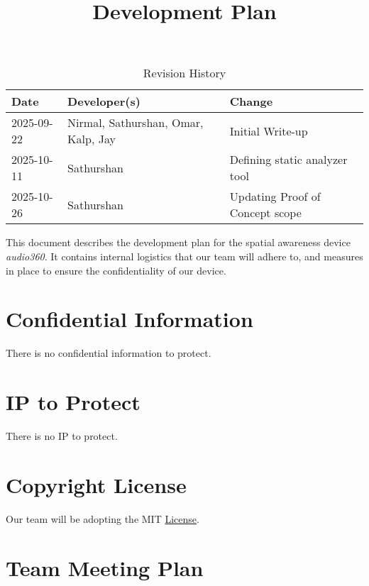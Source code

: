 \documentclass{article}
\title{Development Plan\\\progname}
\author{\authname}
\date{}
\begin{document}
\maketitle

\newpage{}

\begin{table}[hp]
\caption{Revision History} \label{TblRevisionHistory}
\begin{tabularx}{\textwidth}{llX}
\toprule
\textbf{Date} & \textbf{Developer(s)} & \textbf{Change}\\
\midrule
2025-09-22 & Nirmal, Sathurshan, Omar, Kalp, Jay & Initial Write-up\\
2025-10-11 & Sathurshan & Defining static analyzer tool\\
2025-10-26 & Sathurshan & Updating Proof of Concept scope\\
\bottomrule
\end{tabularx}
\end{table}

\newpage

\tableofcontents

\newpage{}

This document describes the development plan for the spatial awareness device
\textit{audio360}. It contains internal logistics that our team will adhere to,
and measures in place to ensure the confidentiality of our device.

\section{Confidential Information}

There is no confidential information to protect.

\section{IP to Protect}

There is no IP to protect.

\section{Copyright License}

Our team will be adopting the MIT
\href{https://github.com/Nirmal-code/SixSense/blob/main/LICENSE}{License}.

\section{Team Meeting Plan}
\end{document}
